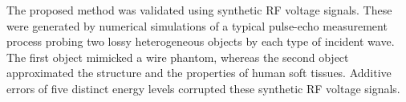 The proposed method was validated using
synthetic \ac{RF} voltage signals.
These were generated by
numerical simulations of
a typical pulse-echo measurement process probing
two lossy heterogeneous objects by
each type of
incident wave.
The first object mimicked
a wire phantom, whereas %
the second object approximated
the structure and
the properties of
human soft tissues.
Additive errors of
five distinct energy levels corrupted
these synthetic \ac{RF} voltage signals.

